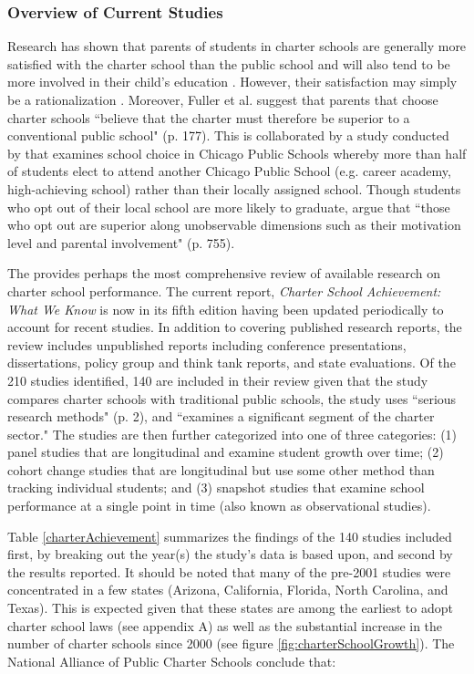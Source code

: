 \documentclass[letterpaper,12p,twoside]{article} %
\begin{document}
\subsubsection{Overview of Current Studies}
Research has shown that parents of students in charter schools are generally more satisfied with the charter school than the public school and will also tend to be more involved in their child's education \cite{TeskeSchneider2001,VanourekMannoFinnBierlein1998}. However, their satisfaction may simply be a rationalization \cite{HubbardKulkarni2009}. Moreover, Fuller et al. \cite<1996, as cited in>{HubbardKulkarni2009} suggest that parents that choose charter schools ``believe that the charter must therefore be superior to a conventional public school" (p. 177). This is collaborated by a study conducted by  that examines school choice in Chicago Public Schools whereby more than half of students elect to attend another Chicago Public School (e.g. career academy, high-achieving school) rather than their locally assigned school. Though students who opt out of their local school are more likely to graduate,  argue that ``those who opt out are superior along unobservable dimensions such as their motivation level and parental involvement" (p. 755). 

The  provides perhaps the most comprehensive review of available research on charter school performance. The current report, \textit{Charter School Achievement: What We Know} is now in its fifth edition having been updated periodically to account for recent studies. In addition to covering published research reports, the review includes unpublished reports including conference presentations, dissertations, policy group and think tank reports, and state evaluations. Of the 210 studies identified, 140 are included in their review given that the study compares charter schools with traditional public schools, the study uses ``serious research methods" (p. 2), and ``examines a significant segment of the charter sector." The studies are then further categorized into one of three categories: (1) panel studies that are longitudinal and examine student growth over time; (2) cohort change studies that are longitudinal but use some other method than tracking individual students; and (3) snapshot studies that examine school performance at a single point in time (also known as observational studies).

Table \ref{charterAchievement} summarizes the findings of the 140 studies included first, by breaking out the year(s) the study's data is based upon, and second by the results reported. It should be noted that many of the pre-2001 studies were concentrated in a few states (Arizona, California, Florida, North Carolina, and Texas). This is expected given that these states are among the earliest to adopt charter school laws (see appendix A) as well as the substantial increase in the number of charter schools since 2000 (see figure \ref{fig:charterSchoolGrowth}). The National Alliance of Public Charter Schools conclude that:
\end{document}
